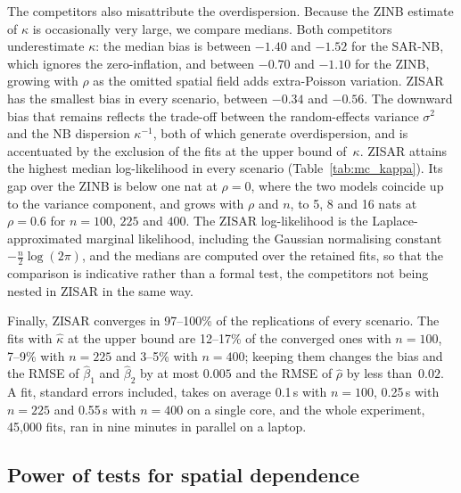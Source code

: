The competitors also misattribute the overdispersion.
Because the ZINB estimate of $\kappa$ is occasionally very large, we compare medians.
Both competitors underestimate $\kappa$: the median bias is between $-1.40$ and $-1.52$ for the SAR-NB, which ignores the zero-inflation, and between $-0.70$ and $-1.10$ for the ZINB, growing with $\rho$ as the omitted spatial field adds extra-Poisson variation.
ZISAR has the smallest bias in every scenario, between $-0.34$ and $-0.56$.
The downward bias that remains reflects the trade-off between the random-effects variance $\sigma^2$ and the NB dispersion $\kappa^{-1}$, both of which generate overdispersion, and is accentuated by the exclusion of the fits at the upper bound of~$\kappa$.
ZISAR attains the highest median log-likelihood in every scenario (Table~\ref{tab:mc_kappa}).
Its gap over the ZINB is below one nat at $\rho=0$, where the two models coincide up to the variance component, and grows with $\rho$ and $n$, to 5, 8 and 16 nats at $\rho=0.6$ for $n=100$, $225$ and $400$.
The ZISAR log-likelihood is the Laplace-approximated marginal likelihood, including the Gaussian normalising constant $-\tfrac n2\log(2\pi)$, and the medians are computed over the retained fits, so that the comparison is indicative rather than a formal test, the competitors not being nested in ZISAR in the same way.

Finally, ZISAR converges in 97--100\% of the replications of every scenario.
The fits with $\hat\kappa$ at the upper bound are 12--17\% of the converged ones with $n = 100$, 7--9\% with $n = 225$ and 3--5\% with $n = 400$; keeping them changes the bias and the RMSE of $\hat\beta_1$ and $\hat\beta_2$ by at most $0.005$ and the RMSE of $\hat\rho$ by less than~$0.02$.
A fit, standard errors included, takes on average 0.1\,s with $n=100$, 0.25\,s with $n=225$ and 0.55\,s with $n=400$ on a single core, and the whole experiment, 45{,}000 fits, ran in nine minutes in parallel on a laptop.

\subsection{Power of tests for spatial dependence}\label{sec:mc_power}

